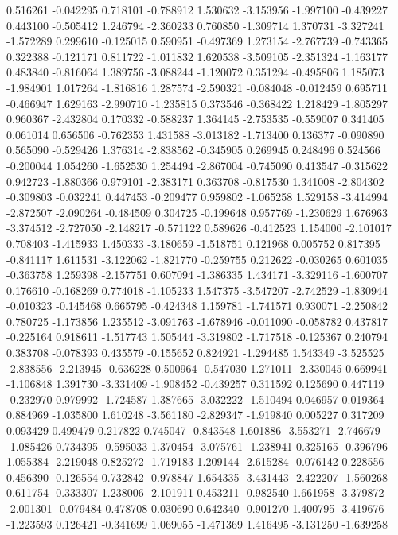 0.516261
-0.042295
0.718101
-0.788912
1.530632
-3.153956
-1.997100
-0.439227
0.443100
-0.505412
1.246794
-2.360233
0.760850
-1.309714
1.370731
-3.327241
-1.572289
0.299610
-0.125015
0.590951
-0.497369
1.273154
-2.767739
-0.743365
0.322388
-0.121171
0.811722
-1.011832
1.620538
-3.509105
-2.351324
-1.163177
0.483840
-0.816064
1.389756
-3.088244
-1.120072
0.351294
-0.495806
1.185073
-1.984901
1.017264
-1.816816
1.287574
-2.590321
-0.084048
-0.012459
0.695711
-0.466947
1.629163
-2.990710
-1.235815
0.373546
-0.368422
1.218429
-1.805297
0.960367
-2.432804
0.170332
-0.588237
1.364145
-2.753535
-0.559007
0.341405
0.061014
0.656506
-0.762353
1.431588
-3.013182
-1.713400
0.136377
-0.090890
0.565090
-0.529426
1.376314
-2.838562
-0.345905
0.269945
0.248496
0.524566
-0.200044
1.054260
-1.652530
1.254494
-2.867004
-0.745090
0.413547
-0.315622
0.942723
-1.880366
0.979101
-2.383171
0.363708
-0.817530
1.341008
-2.804302
-0.309803
-0.032241
0.447453
-0.209477
0.959802
-1.065258
1.529158
-3.414994
-2.872507
-2.090264
-0.484509
0.304725
-0.199648
0.957769
-1.230629
1.676963
-3.374512
-2.727050
-2.148217
-0.571122
0.589626
-0.412523
1.154000
-2.101017
0.708403
-1.415933
1.450333
-3.180659
-1.518751
0.121968
0.005752
0.817395
-0.841117
1.611531
-3.122062
-1.821770
-0.259755
0.212622
-0.030265
0.601035
-0.363758
1.259398
-2.157751
0.607094
-1.386335
1.434171
-3.329116
-1.600707
0.176610
-0.168269
0.774018
-1.105233
1.547375
-3.547207
-2.742529
-1.830944
-0.010323
-0.145468
0.665795
-0.424348
1.159781
-1.741571
0.930071
-2.250842
0.780725
-1.173856
1.235512
-3.091763
-1.678946
-0.011090
-0.058782
0.437817
-0.225164
0.918611
-1.517743
1.505444
-3.319802
-1.717518
-0.125367
0.240794
0.383708
-0.078393
0.435579
-0.155652
0.824921
-1.294485
1.543349
-3.525525
-2.838556
-2.213945
-0.636228
0.500964
-0.547030
1.271011
-2.330045
0.669941
-1.106848
1.391730
-3.331409
-1.908452
-0.439257
0.311592
0.125690
0.447119
-0.232970
0.979992
-1.724587
1.387665
-3.032222
-1.510494
0.046957
0.019364
0.884969
-1.035800
1.610248
-3.561180
-2.829347
-1.919840
0.005227
0.317209
0.093429
0.499479
0.217822
0.745047
-0.843548
1.601886
-3.553271
-2.746679
-1.085426
0.734395
-0.595033
1.370454
-3.075761
-1.238941
0.325165
-0.396796
1.055384
-2.219048
0.825272
-1.719183
1.209144
-2.615284
-0.076142
0.228556
0.456390
-0.126554
0.732842
-0.978847
1.654335
-3.431443
-2.422207
-1.560268
0.611754
-0.333307
1.238006
-2.101911
0.453211
-0.982540
1.661958
-3.379872
-2.001301
-0.079484
0.478708
0.030690
0.642340
-0.901270
1.400795
-3.419676
-1.223593
0.126421
-0.341699
1.069055
-1.471369
1.416495
-3.131250
-1.639258
